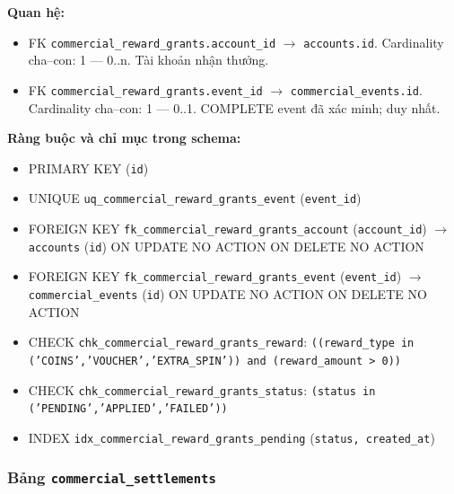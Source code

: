 \textbf{Quan hệ:}

\begin{itemize}

\item FK \texttt{commercial\_reward\_grants.account\_id} $\rightarrow$ \texttt{accounts.id}. Cardinality cha--con: 1 — 0..n. Tài khoản nhận thưởng.

\item FK \texttt{commercial\_reward\_grants.event\_id} $\rightarrow$ \texttt{commercial\_events.id}. Cardinality cha--con: 1 — 0..1. COMPLETE event đã xác minh; duy nhất.

\end{itemize}

\textbf{Ràng buộc và chỉ mục trong schema:}

\begin{itemize}

\item PRIMARY KEY (\texttt{id})

\item UNIQUE \texttt{uq\_commercial\_reward\_grants\_event} (\texttt{event\_id})

\item FOREIGN KEY \texttt{fk\_commercial\_reward\_grants\_account} (\texttt{account\_id}) $\rightarrow$ \texttt{accounts} (\texttt{id}) ON UPDATE NO ACTION ON DELETE NO ACTION

\item FOREIGN KEY \texttt{fk\_commercial\_reward\_grants\_event} (\texttt{event\_id}) $\rightarrow$ \texttt{commercial\_events} (\texttt{id}) ON UPDATE NO ACTION ON DELETE NO ACTION

\item CHECK \texttt{chk\_commercial\_reward\_grants\_reward}: \texttt{((reward\_type in ('COINS','VOUCHER','EXTRA\_SPIN')) and (reward\_amount > 0))}

\item CHECK \texttt{chk\_commercial\_reward\_grants\_status}: \texttt{(status in ('PENDING','APPLIED','FAILED'))}

\item INDEX \texttt{idx\_commercial\_reward\_grants\_pending} (\texttt{status, created\_at})

\end{itemize}

\subsubsection{Bảng \texttt{commercial\_settlements}}

